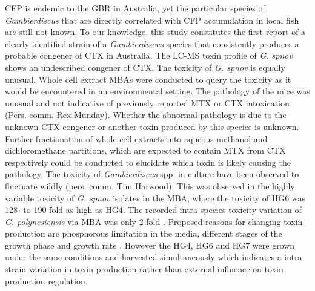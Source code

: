 \documentclass[12pt]{article}
\begin{document}
CFP is endemic to the GBR in Australia, yet the particular species of \textit{Gambierdiscus} that are directly correlated with CFP accumulation in local fish are still not known. To our knowledge, this study constitutes the first report of a clearly identified strain of a \textit{Gambierdiscus} species that consistently produces a probable congener of CTX in Australia. The LC-MS toxin profile of \emph{G. spnov} shows an undescribed congener of CTX.
The toxicity of \emph{G. spnov} is equally unusual. Whole cell extract MBAs were conducted to query the toxicity as it would be encountered in an environmental setting. The pathology of the mice was unusual and not indicative of previously reported MTX or CTX intoxication (Pers. comm. Rex Munday). Whether the abnormal pathology is due to the unknown CTX congener or another toxin produced by this species is unknown. Further fractionation of whole cell extracts into aqueous methanol and dichloromethane partitions, which are expected to contain MTX from CTX respectively \citep{satake1993structure} could be conducted to elucidate which toxin is likely causing the pathology.
The toxicity of \emph{Gambierdiscus} spp. in culture have been observed to fluctuate wildly (pers. comm. Tim Harwood). This was observed in the highly variable toxicity of \emph{G. spnov} isolates in the MBA, where the toxicity of HG6 was 128- to 190-fold as high as HG4.  The recorded intra species toxicity variation of \emph{G. polynesiensis} via MBA was only 2-fold \citep{chinain2010growth}. Proposed reasons for changing toxin production are phosphorous limitation in the media, different stages of the growth phase and growth rate \citep{sperr1996variation,chinain2010growth}. However the HG4, HG6 and HG7 were grown under the same conditions and harvested simultaneously which indicates a intra strain variation in toxin production rather than external influence on toxin production regulation.\\



\end{document}
